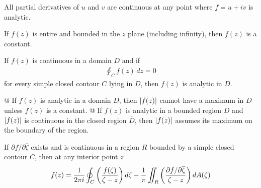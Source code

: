     \begin{thm}
        All partial derivatives of $u$ and $v$ are continuous at any point
        where $f=u+iv$ is analytic.
    \end{thm}

    \begin{thm}[Lioville]
        If $f(z)$ is entire and bounded in the $z$ plane (including
        infinity), then $f(z)$ is a constant.
    \end{thm}

    \begin{thm}[Morera]
        If $f(z)$ is continuous in a domain $D$ and if
        \begin{align*}
            \oint_C f(z) \, dz = 0
        \end{align*}
        for every simple closed contour $C$ lying in $D$, then $f(z)$ is
        analytic in $D$.
    \end{thm}

    \begin{thm}
        \begin{easylist}[enumerate]
            @ If $f(z)$ is analytic in a domain $D$, then $\left\lvert f(z) \right\rvert$
            cannot have a maximum in $D$ unless $f(z)$ is a constant.
            @ If $f(z)$ is analytic in a bounded region $D$ and $\left\lvert f(z) \right\rvert$
            is continuous in the closed region $\overline{D}$, then
            $\left\lvert f(z) \right\rvert$ assumes its maximum on the boundary of the region.
        \end{easylist}
    \end{thm}

    \begin{thm}
        If $\partial f / \partial \overline{\zeta}$ exists and is continuous
        in a region $R$ bounded by a simple closed contour $C$, then at any
        interior point $z$
        \begin{align*}
            f(z) =
            \frac{1}{2 \pi i}
            \oint_C {\left( \frac{f(\zeta)}{\zeta - z} \right)}\,d\zeta -
            \frac{1}{\pi}
            \iint_R {\left( \frac{\partial f / \partial
            \overline{\zeta}}{\zeta-z} \right)}\,dA(\zeta)
        \end{align*}
    \end{thm}

